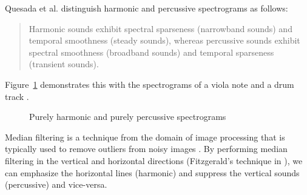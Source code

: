 \documentclass[letter,12pt]{article}
\begin{document}
Quesada et al. \cite{spectraldesc} distinguish harmonic and percussive spectrograms as follows:

\begin{quote}
	Harmonic sounds exhibit spectral sparseness (narrowband sounds) and temporal smoothness (steady sounds), whereas percussive sounds exhibit spectral smoothness (broadband sounds) and temporal sparseness (transient sounds).
\end{quote}

Figure~\ref{fig:hpspec} demonstrates this with the spectrograms of a viola note \cite{misviola} and a drum track \cite{freesounddrum}.

\begin{figure}[ht]
	\vspace*{-0.5cm}
	\centering
	\hspace{0.2em}
	\caption{Purely harmonic and purely percussive spectrograms}
	\label{fig:hpspec}%
\end{figure}

Median filtering is a technique from the domain of image processing that is typically used to remove outliers from noisy images \cite{imagenoise}. By performing median filtering in the vertical and horizontal directions (Fitzgerald's technique in \cite{fitzgerald}), we can emphasize the horizontal lines (harmonic) and suppress the vertical sounds (percussive) and vice-versa.

\vfill
\clearpage %
\end{document}
